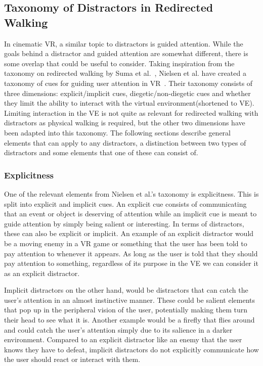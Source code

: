 \subsection{Taxonomy of Distractors in Redirected Walking}\label{sec:distractorTaxonomy}
In cinematic VR, a similar topic to distractors is guided attention. While the goals behind a distractor and guided attention are somewhat different, there is some overlap that could be useful to consider. Taking inspiration from the taxonomy on redirected walking by Suma et al.~\cite{suma2012taxonomy}, Nielsen et al. have created a taxonomy of cues for guiding user attention in VR~\cite{nielsen2016missing}. Their taxonomy consists of three dimensions: explicit/implicit cues, diegetic/non-diegetic cues and whether they limit the ability to interact with the virtual environment(shortened to VE). Limiting interaction in the VE is not quite as relevant for redirected walking with distractors as physical walking is required, but the other two dimensions have been adapted into this taxonomy. The following sections describe general elements that can apply to any distractors, a distinction between two types of distractors and some elements that one of these can consist of. 
\subsubsection{Explicitness}
One of the relevant elements from Nielsen et al.'s taxonomy is explicitness. This is split into explicit and implicit cues. An explicit cue consists of communicating that an event or object is deserving of attention while an implicit cue is meant to guide attention by simply being salient or interesting. In terms of distractors, these can also be explicit or implicit. An example of an explicit distractor would be a moving enemy in a VR game or something that the user has been told to pay attention to whenever it appears. As long as the user is told that they should pay attention to something, regardless of its purpose in the VE we can consider it as an explicit distractor. 

Implicit distractors on the other hand, would be distractors that can catch the user's attention in an almost instinctive manner. These could be salient elements that pop up in the peripheral vision of the user, potentially making them turn their head to see what it is. Another example would be a firefly that flies around and could catch the user's attention simply due to its salience in a darker environment. Compared to an explicit distractor like an enemy that the user knows they have to defeat, implicit distractors do not explicitly communicate how the user should react or interact with them. 


